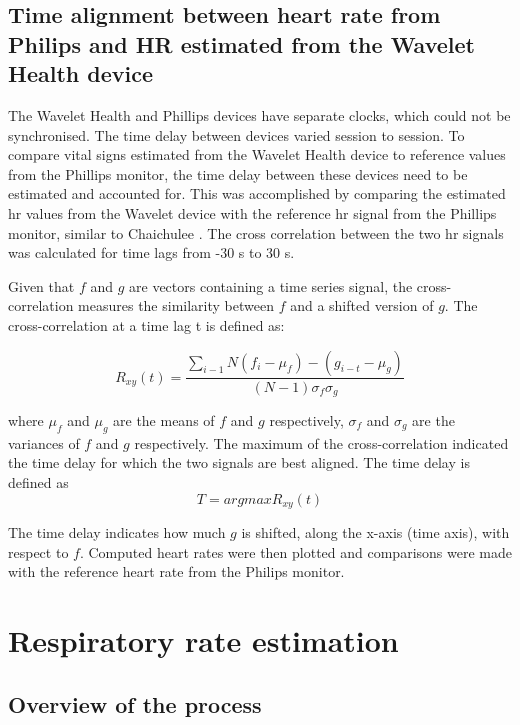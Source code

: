 \subsection{Time alignment between heart rate from Philips and HR estimated from the Wavelet Health device}

The Wavelet Health and Phillips devices have separate clocks, which could not be synchronised. The time delay between devices varied session to session. To compare vital signs estimated from the Wavelet Health device to reference values from the Phillips monitor, the time delay between these devices need to be estimated and accounted for. This was accomplished by comparing the estimated \gls{hr} values from the Wavelet device with the reference \gls{hr} signal from the Phillips monitor, similar to Chaichulee \cite{chaichulee2018non}. The cross correlation between the two \gls{hr} signals was calculated for time lags from -30 s to 30 s. 

Given that $f$ and $g$ are vectors containing a time series signal, the cross-correlation measures the similarity between $f$ and a shifted version of $g$. The cross-correlation at a time lag t is defined as:

\begin{equation}
	R_{xy}(t) =\dfrac{\sum_{i-1}N(f_{i} - μ_{f}) - (g_{i-t} - μ_{g})}{(N-1) σ_{f}σ_{g}}
\end{equation}

where $μ_{f}$ and $μ_{g}$ are the means of $f$ and $g$ respectively, $σ_{f}$ and $σ_{g}$ are the variances of $f$ and $g$ respectively. The maximum of the cross-correlation indicated the time delay for which the two signals are best aligned. The time delay is defined as
\begin{equation}
  T = argmax R_{xy}(t)
\end{equation}

The time delay indicates how much $g$ is shifted, along the x-axis (time axis), with respect to $f$. Computed heart rates were then plotted and comparisons were made with the reference heart rate from the Philips monitor. 

\section{Respiratory rate estimation}
\subsection{Overview of the process}

